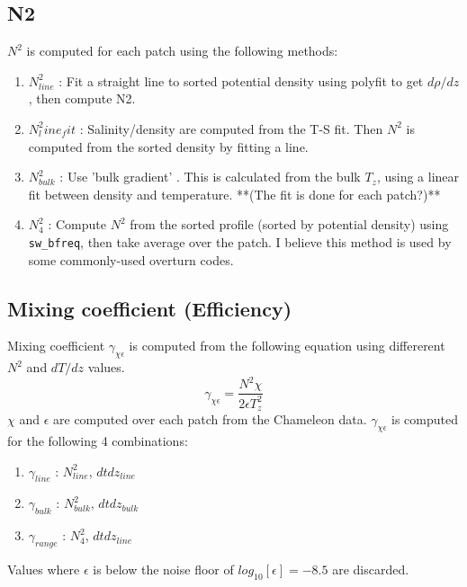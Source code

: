\documentclass[11pt]{article}
\begin{document}
\subsection{N2}

$N^2$ is computed for each patch using the following methods:
\begin{enumerate}
\item $N^2_{line}$ : Fit a straight line to sorted potential density using polyfit to get $d\rho/dz$, then compute N2.
\item $N^2_line_fit$ : Salinity/density are computed from the T-S fit.  Then $N^2$ is computed from the sorted density by fitting a line.
\item $N^2_{bulk}$ : Use 'bulk gradient' . This is calculated from the bulk $T_z$, using a linear fit between density and temperature. **(The fit is done for each patch?)**
\item $N^2_4$ : Compute $N^2$ from the sorted profile (sorted by potential density) using \verb+sw_bfreq+, then take average over the patch. I believe this method is used by some commonly-used overturn codes.
\end{enumerate}


\subsection{Mixing coefficient (Efficiency)}

Mixing coefficient $\gamma_{\chi\epsilon}$ is computed from the following equation using differerent $N^2$ and $dT/dz$ values.
\begin{equation}
\gamma_{\chi\epsilon}=\frac{N^2 \chi}{2\epsilon T_{z}^{2}} 
\end{equation}
$\chi$ and $\epsilon$ are computed over each patch from the Chameleon data. $\gamma_{\chi\epsilon}$ is computed for the following 4 combinations:
\begin{enumerate}
\item  $\gamma_{line}$ : $N^{2}_{line}$, $dtdz_{line}$
\item  $\gamma_{bulk}$ : $N^{2}_{bulk}$, $dtdz_{bulk}$
\item  $\gamma_{range}$ : $N^{2}_{4}$, $dtdz_{line}$
\end{enumerate}
Values where $\epsilon$ is below the noise floor of $log_{10}[\epsilon]=-8.5$ are discarded.
\end{document}
